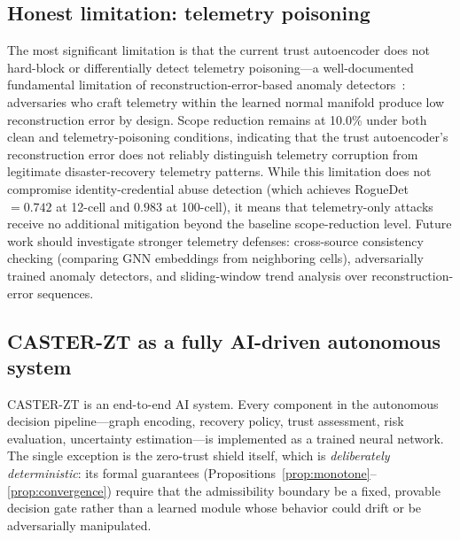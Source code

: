 \documentclass[10pt,journal,compsoc]{IEEEtran}
\begin{document}
\subsection{Honest limitation: telemetry poisoning}
The most significant limitation is that the current trust autoencoder does not hard-block or differentially detect telemetry poisoning---a well-documented fundamental limitation of reconstruction-error-based anomaly detectors~\cite{pang2021deep,erba2020constrained,kravchik2022efficient}: adversaries who craft telemetry within the learned normal manifold produce low reconstruction error by design.
Scope reduction remains at 10.0\% under both clean and telemetry-poisoning conditions, indicating that the trust autoencoder's reconstruction error does not reliably distinguish telemetry corruption from legitimate disaster-recovery telemetry patterns.
While this limitation does not compromise identity-credential abuse detection (which achieves RogueDet $= 0.742$ at 12-cell and $0.983$ at 100-cell), it means that telemetry-only attacks receive no additional mitigation beyond the baseline scope-reduction level.
Future work should investigate stronger telemetry defenses: cross-source consistency checking (comparing GNN embeddings from neighboring cells), adversarially trained anomaly detectors, and sliding-window trend analysis over reconstruction-error sequences.

\subsection{CASTER-ZT as a fully AI-driven autonomous system}
\label{sec:ai_native}

CASTER-ZT is an end-to-end AI system.
Every component in the autonomous decision pipeline---graph encoding, recovery policy, trust assessment, risk evaluation, uncertainty estimation---is implemented as a trained neural network.
The single exception is the zero-trust shield itself, which is \emph{deliberately deterministic}: its formal guarantees (Propositions~\ref{prop:monotone}--\ref{prop:convergence}) require that the admissibility boundary be a fixed, provable decision gate rather than a learned module whose behavior could drift or be adversarially manipulated.
\end{document}
